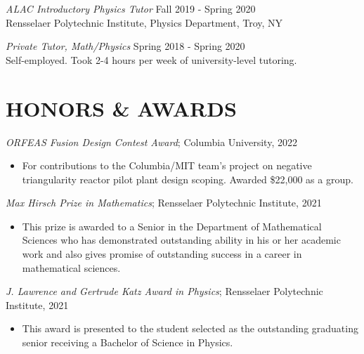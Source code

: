 \documentclass[margin]{rpires}
\begin{document}
\begin{resume}
    \textit{ALAC Introductory Physics Tutor} \hfill Fall 2019 - Spring 2020 \\
    Rensselaer Polytechnic Institute, Physics Department, Troy, NY

    \textit{Private Tutor, Math/Physics} \hfill Spring 2018 - Spring 2020 \\
    Self-employed. Took 2-4 hours per week of university-level tutoring.
    
    
\section{HONORS \& AWARDS} 

\textit{ORFEAS Fusion Design Contest Award}; Columbia University, 2022
\begin{itemize}
    \item[] {For contributions to the Columbia/MIT team's project on negative triangularity reactor pilot plant design scoping. Awarded \$22,000 as a group.}
\end{itemize}
\vspace{-0.4cm}

\textit{Max Hirsch Prize in Mathematics}; Rensselaer Polytechnic Institute, 2021
\begin{itemize}
    \item[] {This prize is awarded to a Senior in the Department of Mathematical Sciences who has demonstrated outstanding ability in his or her academic work and also gives promise of outstanding success in a career in mathematical sciences.}
\end{itemize}
\vspace{-0.4cm}

\textit{J. Lawrence and Gertrude Katz Award in Physics}; Rensselaer Polytechnic Institute, 2021
\begin{itemize} 
    \item[] {This award is presented to the student selected as the outstanding graduating senior receiving a Bachelor of Science in Physics.}
\end{itemize}
\vspace{-0.4cm}


\end{resume}
\end{document}
